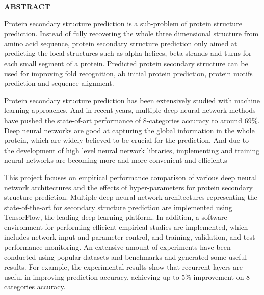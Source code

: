 \newpage
{}

\centerline{\bf \large ABSTRACT}
\vskip 10mm %
Protein secondary structure prediction is a sub-problem of protein structure prediction. Instead of fully recovering the whole three dimensional structure from amino acid sequence, protein secondary structure prediction only aimed at predicting the local structures such as alpha helices, beta strands and turns for each small segment of a protein. Predicted protein secondary structure can be used for improving fold recognition, ab initial protein prediction, protein motifs prediction and sequence alignment.

Protein secondary structure prediction has been extensively studied with machine learning approaches. And in recent years, multiple deep neural network methods have pushed the state-of-art performance of 8-categories accuracy to around 69\%. Deep neural networks are good at capturing the global information in the whole protein, which are widely believed to be crucial for the prediction. And due to the development of high level neural network libraries, implementing and training neural networks are becoming more and more convenient and efficient.s

This project focuses on empirical performance comparison of various deep neural network architectures and the effects of hyper-parameters for protein secondary structure prediction. Multiple deep neural network architectures representing the state-of-the-art for secondary structure prediction are implemented using TensorFlow, the leading deep learning platform. In addition, a software environment for performing efficient empirical studies are implemented, which includes network input and parameter control, and training, validation,  and test performance monitoring. An extensive amount of experiments have been conducted using popular datasets and benchmarks and generated some useful results. For example,  the experimental results show that recurrent layers are useful in improving prediction accuracy, achieving up to 5\% improvement on 8-categories accuracy.
